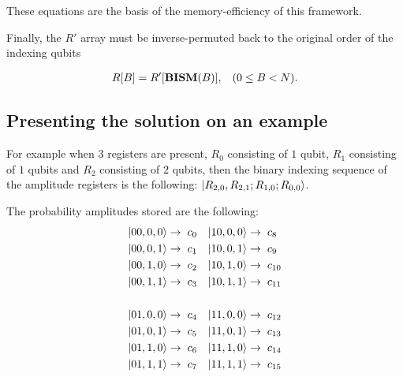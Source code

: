These equations are the basis of the memory-efficiency of this framework.

Finally, the $R'$ array must be inverse-permuted back to the original order of the indexing qubits

\begin{align*}
R[B] = R'[\text{\textbf{BISM}}(B)], \hspace{3mm}(0\leq{}B<N).
\end{align*}

\subsection{Presenting the solution on an example}

For example when 3 registers are present, $R_0$ consisting of $1$ qubit, $R_1$ consisting of $1$ qubits and $R_2$ consisting of $2$ qubits, then the binary indexing sequence of the amplitude registers is the following: $\ket{R_{2,0},R_{2,1};R_{1,0};R_{0,0}}$.

The probability amplitudes stored are the following:
\begin{align*}
\ket{00,0,0} \rightarrow & \hspace{2mm} c_{0} &
\ket{10,0,0} \rightarrow & \hspace{2mm} c_{8} \\
\ket{00,0,1} \rightarrow & \hspace{2mm} c_{1} &
\ket{10,0,1} \rightarrow & \hspace{2mm} c_{9} \\
\ket{00,1,0} \rightarrow & \hspace{2mm} c_{2} &
\ket{10,1,0} \rightarrow & \hspace{2mm} c_{10} \\
\ket{00,1,1} \rightarrow & \hspace{2mm} c_{3} &
\ket{10,1,1} \rightarrow & \hspace{2mm} c_{11} \\
\\
\ket{01,0,0} \rightarrow & \hspace{2mm} c_{4} &
\ket{11,0,0} \rightarrow & \hspace{2mm} c_{12} \\
\ket{01,0,1} \rightarrow & \hspace{2mm} c_{5} &
\ket{11,0,1} \rightarrow & \hspace{2mm} c_{13} \\
\ket{01,1,0} \rightarrow & \hspace{2mm} c_{6} &
\ket{11,1,0} \rightarrow & \hspace{2mm} c_{14} \\
\ket{01,1,1} \rightarrow & \hspace{2mm} c_{7} &
\ket{11,1,1} \rightarrow & \hspace{2mm} c_{15} \\
\end{align*}

